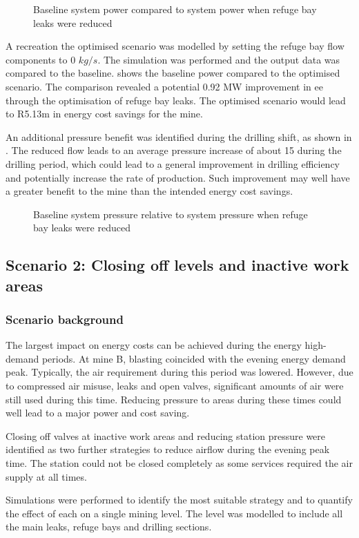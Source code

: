 	\par 
	\begin{figure}[h!]
		\centering
		
		\caption{Baseline system power compared to system power when refuge bay leaks were reduced}
		\label{fig: RefugeBay Power.}
	\end{figure} 
	A recreation the optimised scenario was modelled by setting the refuge bay flow components to 0 $kg/s$. The simulation was performed and the output data was compared to the baseline.  shows the baseline power compared to the optimised scenario. The comparison revealed a potential 0.92 MW improvement in \gls{ee} through the optimisation of refuge bay leaks. The optimised scenario would lead to R5.13m in energy cost savings for the mine.
	\par
	An additional pressure benefit was identified during the drilling shift, as shown in . The reduced flow leads to an average pressure increase of about 15  during the drilling period, which could lead to a general improvement in drilling efficiency and potentially increase the rate of production. Such improvement may well have a greater benefit to the mine than the intended energy cost savings.
	\begin{figure}[h!]
		\centering
		
		\caption{Baseline system pressure relative to system pressure when refuge bay leaks were reduced}
		\label{fig: RefugeBay Pressures.}
	\end{figure} 
	\subsection{Scenario 2: Closing off levels and inactive work areas}
	\subsubsection{Scenario background}
	The largest impact on energy costs can be achieved during the energy high-demand periods. At mine B, blasting coincided with the evening energy demand peak. Typically, the air requirement during this period was lowered. However, due to compressed air misuse, leaks and open valves, significant amounts of air were still used during this time. Reducing pressure to areas during these times could well lead to a major power and cost saving. 
	\par 
	Closing off valves at inactive work areas and reducing station pressure were identified as two further strategies to reduce airflow during the evening peak time. The station could not be closed completely as some services required the air supply at all times. 
	\par 
	Simulations were performed to identify the most suitable strategy and to quantify the effect of each on a single mining level. The level was modelled to include all the main leaks, refuge bays and drilling sections.  
